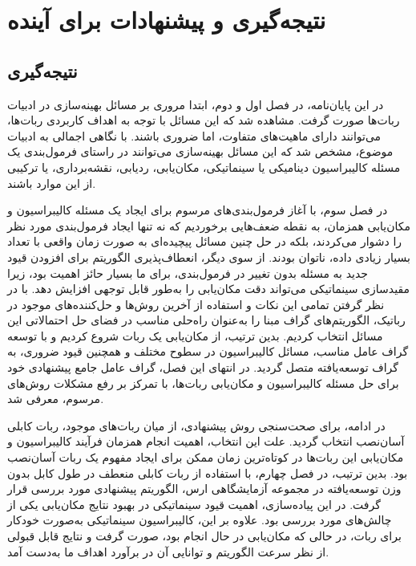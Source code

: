 

\chapter{نتیجه‌گیری و پیشنهادات برای آینده}
\section{نتیجه‌گیری}

در این پایان‌نامه، در فصل اول و دوم، ابتدا مروری بر مسائل بهینه‌سازی در ادبیات ربات‌ها صورت گرفت. مشاهده شد که این مسائل با توجه به اهداف کاربردی ربات‌ها، می‌توانند دارای ماهیت‌های متفاوت، اما ضروری باشند. با نگاهی اجمالی به ادبیات موضوع، مشخص شد که این مسائل بهینه‌سازی می‌توانند در راستای فرمول‌بندی یک مسئله کالیبراسیون دینامیکی یا سینماتیکی، مکان‌یابی، ردیابی، نقشه‌برداری، یا ترکیبی از این موارد باشند.

در فصل سوم، با آغاز فرمول‌بندی‌های مرسوم برای ایجاد یک مسئله کالیبراسیون و مکان‌یابی همزمان، به نقطه ضعف‌هایی برخوردیم که نه تنها ایجاد فرمول‌بندی مورد نظر را دشوار می‌کردند، بلکه در حل چنین مسائل پیچیده‌ای به صورت زمان واقعی با تعداد بسیار زیادی داده، ناتوان بودند. از سوی دیگر، انعطاف‌پذیری الگوریتم برای افزودن قیود جدید به مسئله بدون تغییر در فرمول‌بندی، برای ما بسیار حائز اهمیت بود، زیرا مقیدسازی سینماتیکی می‌تواند دقت مکان‌یابی را به‌طور قابل توجهی افزایش دهد. با در نظر گرفتن تمامی این نکات و استفاده از آخرین روش‌ها و حل‌کننده‌های موجود در رباتیک، الگوریتم‌های گراف مبنا را به‌عنوان راه‌حلی مناسب در فضای حل احتمالاتی این مسائل انتخاب کردیم. بدین ترتیب، از مکان‌یابی یک ربات شروع کردیم و با توسعه گراف عامل مناسب، مسائل کالیبراسیون در سطوح مختلف و همچنین قیود ضروری، به گراف توسعه‌یافته متصل گردید. در انتهای این فصل، گراف عامل جامع پیشنهادی خود برای حل مسئله کالیبراسیون و مکان‌یابی ربات‌ها، با تمرکز بر رفع مشکلات روش‌های مرسوم، معرفی شد.

در ادامه، برای صحت‌سنجی روش پیشنهادی، از میان ربات‌های موجود، ربات کابلی آسان‌نصب انتخاب گردید. علت این انتخاب، اهمیت انجام همزمان فرآیند کالیبراسیون و مکان‌یابی این ربات‌ها در کوتاه‌ترین زمان ممکن برای ایجاد مفهوم یک ربات آسان‌نصب بود. بدین ترتیب، در فصل چهارم، با استفاده از ربات کابلی منعطف در طول کابل بدون وزن توسعه‌یافته در مجموعه آزمایشگاهی ارس، الگوریتم پیشنهادی مورد بررسی قرار گرفت. در این پیاده‌سازی، اهمیت قیود سینماتیکی در بهبود نتایج مکان‌یابی یکی از چالش‌های مورد بررسی بود. علاوه بر این، کالیبراسیون سینماتیکی به‌صورت خودکار برای ربات، در حالی که مکان‌یابی در حال انجام بود، صورت گرفت و نتایج قابل قبولی از نظر سرعت الگوریتم و توانایی آن در برآورد اهداف ما به‌دست آمد.

